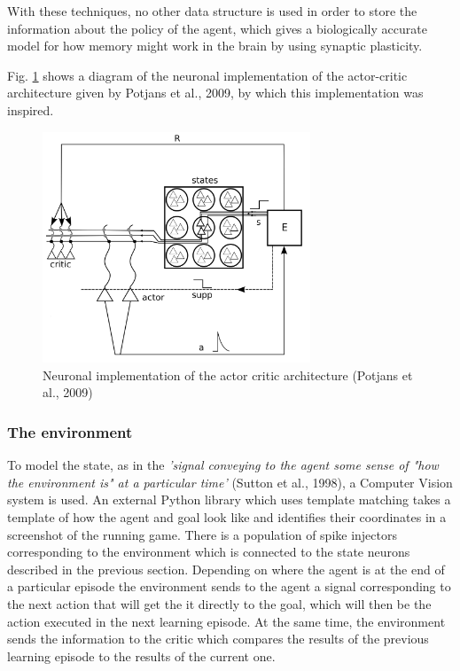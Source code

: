 \documentclass[10pt]{article}
\begin{document}
    With these techniques, no other data structure is used in order to store the information about the policy of the agent, which gives a biologically accurate model for how memory might work in the brain by using synaptic plasticity.

    Fig. \ref{fig:potjansImplementation} shows a diagram of the neuronal implementation of the actor-critic architecture given by Potjans et al., 2009, by which this implementation was inspired.

    \begin{figure}[ht!]
    \centering
    \includegraphics[width=80mm]{./implementation.png}
    \caption{Neuronal implementation of the actor critic architecture (Potjans et al., 2009)}
    \label{fig:potjansImplementation}
    \end{figure}

    \subsubsection{The environment}

    To model the state, as in the \textit{'signal conveying to the agent some sense of "how the environment is" at a particular time'} (Sutton et al., 1998), a Computer Vision system is used. An external Python library which uses template matching takes a template of how the agent and goal look like and identifies their coordinates in a screenshot of the running game. There is a population of spike injectors corresponding to the environment which is connected to the state neurons described in the previous section. Depending on where the agent is at the end of a particular episode the environment sends to the agent a signal corresponding to the next action that will get the it directly to the goal, which will then be the action executed in the next learning episode. At the same time, the environment sends the information to the critic which compares the results of the previous learning episode to the results of the current one.
\end{document}
